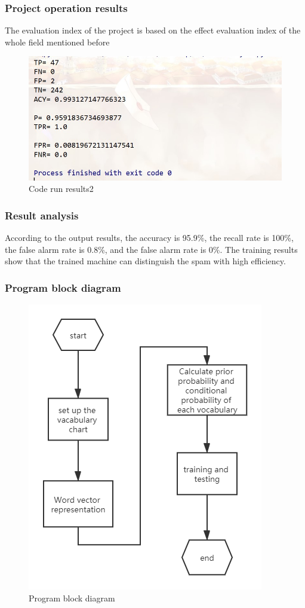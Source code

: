 \documentclass[UTF8]{article}
\begin{document}
\subsubsection{Project operation results}

The evaluation index of the project is based on the effect evaluation index of the whole field mentioned before

\begin{figure}[h]
\centering
\includegraphics[scale = 0.5]{4}
\caption{Code run results2}
\end{figure}

\subsubsection{Result analysis}

According to the output results, the accuracy is 95.9\%, the recall rate is 100\%, the false alarm rate is 0.8\%, and the false alarm rate is 0\%. The training results show that the trained machine can distinguish the spam with high efficiency.

\subsubsection{Program block diagram}

\begin{figure}[h]
\centering
\includegraphics[scale = 0.4]{5}
\caption{Program block diagram}
\end{figure}
\end{document}
